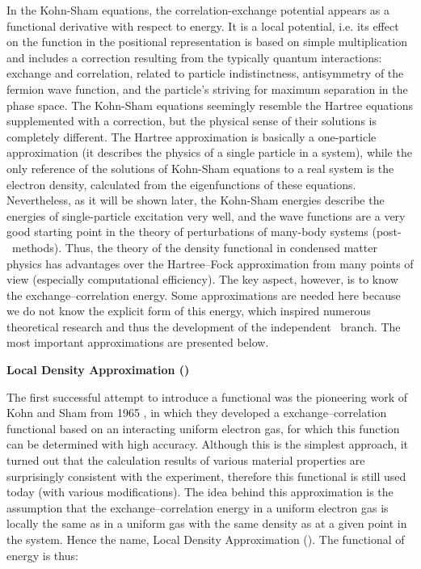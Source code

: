 In the Kohn-Sham equations, the correlation-exchange potential appears as a functional derivative with respect to energy.
It is a local potential, i.e. its effect on the function in the positional representation is based on simple multiplication and includes a correction resulting from the typically quantum interactions: exchange and correlation, related to particle indistinctness, antisymmetry of the fermion wave function, and the particle's striving for maximum separation in the phase space.
The Kohn-Sham equations seemingly resemble the Hartree equations supplemented with a correction, but the physical sense of their solutions is completely different.
The Hartree approximation is basically a one-particle approximation (it describes the physics of a single particle in a system), while the only reference of the solutions of Kohn-Sham equations to a real system is the electron density, calculated from the eigenfunctions of these equations.
Nevertheless, as it will be shown later, the Kohn-Sham energies describe the energies of single-particle excitation very well, and the wave functions are a very good starting point in the theory of perturbations of many-body systems (post-\DFT\ methods).
Thus, the theory of the density functional in condensed matter physics has advantages over the Hartree--Fock approximation from many points of view (especially computational efficiency).
The key aspect, however, is to know the exchange--correlation energy.
Some approximations are needed here because we do not know the explicit form of this energy, which inspired numerous theoretical research and thus the development of the independent \DFT\ branch.
The most important approximations are presented below.

\textbf{Local Density Approximation (\LDA)}

The first successful attempt to introduce a functional was the pioneering work of Kohn and Sham from 1965 \cite{kohn_sham_eq}, in which they developed a exchange--correlation functional based on an interacting uniform electron gas, for which this function can be determined with high accuracy.
Although this is the simplest approach, it turned out that the calculation results of various material properties are surprisingly consistent with the experiment, therefore this functional is still used today (with various modifications).
The idea behind this approximation is the assumption that the exchange--correlation energy in a uniform electron gas is locally the same as in a uniform gas with the same density as at a given point in the system.
Hence the name, Local Density Approximation (\LDA).
The functional of energy is thus:

